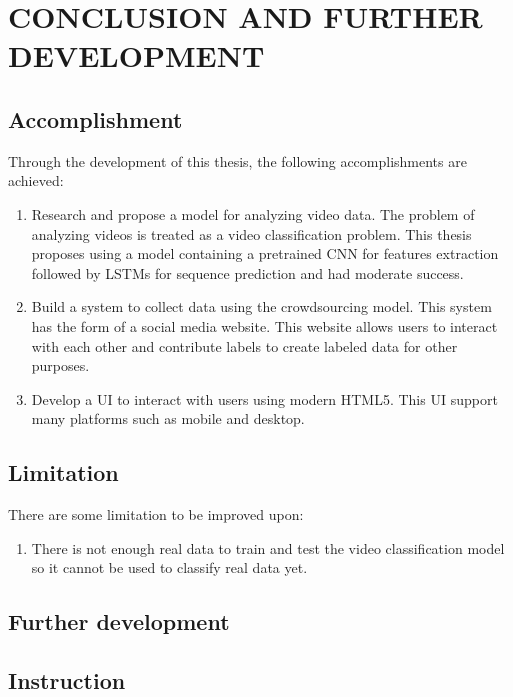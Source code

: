 \chapter{CONCLUSION AND FURTHER DEVELOPMENT}

\section{Accomplishment}
Through the development of this thesis, the following accomplishments are achieved:
\begin{enumerate}
    \item Research and propose a model for analyzing video data. The problem of analyzing videos is treated as a video classification problem. This thesis proposes using a model containing a pretrained CNN for features extraction followed by LSTMs for sequence prediction and had moderate success.
    \item Build a system to collect data using the crowdsourcing model. This system has the form of a social media website. This website allows users to interact with each other and contribute labels to create labeled data for other purposes.
    \item Develop a UI to interact with users using modern HTML5. This UI support many platforms such as mobile and desktop.
\end{enumerate}


\section{Limitation}
There are some limitation to be improved upon:

\begin{enumerate}

\item There is not enough real data to train and test the video classification model so it cannot be used to classify real data yet.
\end{enumerate}

\section{Further development}
\section{Instruction}
